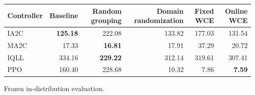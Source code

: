 \begin{tabular}{lrrrrr}
\hline
Controller & Baseline & Random grouping & Domain randomization & Fixed WCE & Online WCE \\
\hline
IA2C & \textbf{125.18} & 222.08 & 133.82 & 177.03 & 131.54 \\
MA2C & 17.33 & \textbf{16.81} & 17.91 & 37.29 & 20.72 \\
IQLL & 334.16 & \textbf{229.22} & 312.14 & 319.61 & 307.41 \\
PPO & 160.40 & 228.68 & 10.32 & 7.86 & \textbf{7.59} \\
\hline
\end{tabular}
Frozen in-distribution evaluation.

